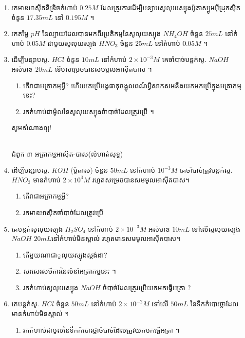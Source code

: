 \documentclass[12pt, a5paper]{article}
\begin{document}
\begin{enumerate}[m]
	\item រកមាឌអាស៊ីតនីឌ្រិចកំហាប់ $0.25M$ ដែលត្រូវការដើម្បីបន្សាបសូលុយស្យុងប៉ូតាស្បូមអ៊ីដ្រុកស៊ីតចំនួន $17.35mL$ នៅ $0.195M$ ។
	\item រកតម្លៃ $pH$ នៃល្បាយដែលបានមកពីរប្រតិកម្មនៃសូលុយស្យុង $NH_4OH$ ចំនួន $25mL$ នៅកំហាប់ $0.05M$ ជាមួយសូលុយស្យុង $HNO_3$ ចំនួន $25mL$ នៅកំហាប់ $0.05M$ ។
	\item ដើម្បីបន្សាបសូ. $HCl$ ចំនួន $10mL$ នៅកំហាប់ $2\times10^{-3}M$ គេចាំបាច់បន្តក់សូ. $NaOH$ អស់មាឌ $20mL$ ទើបសម្រេចបានសមមូលអាស៊ីតបាស ។
	\begin{enumerate}[k]
		\item តើវាជាអត្រាកម្មអ្វី? ហើយគេប្រើអង្គធាតុចង្អុលពណ៍អ្វីសាកសមនឹងយកមកប្រើក្នុងអត្រាកម្មនេះ?
		\item រកកំហាប់ជាម៉ូលនៃសូលុយស្យុងចំាបាច់ដែលត្រូវប្រើ ។
	\end{enumerate}
	\begin{center}
		\sffamily\color{black}
		សូមសំណាងល្អ!
	\end{center}\newpage
	\begin{center}
		\sffamily\color{black}
		\\
		ជំពូក ៣ អត្រាកម្មអាស៊ីត-បាស(លំហាត់សុទ្ធ)
	\end{center}
	\item ដើម្បីបន្សាបសូ. $KOH$ (ប៉ូតាស) ចំនួន $50mL$ នៅកំហាប់ $10^{-3}M$ គេចាំបាច់ត្រូវបន្តក់សូ. $HNO_3$ មានកំហាប់ $2\times 10^{3}M$ រហូតសម្រេចបានសមមូលអាស៊ីតបាស។
	\begin{enumerate}[k,2]
		\item តើវាជាអត្រាកម្មអ្វី? 
		\item រកមាឌអាស៊ីតចាំបាច់ដែលត្រូវប្រើ
	\end{enumerate}
	\item គេបន្តក់សូលុយស្យុង $H_2SO_4$ នៅកំហាប់ $2\times10^{-3}M$ អស់មាឌ $10mL$ ទៅលើសូលុយស្យុង $NaOH$ $20mL$នៅកំហាប់មិនស្គាល់ រហូតមានសមមូលអាស៊ីតបាស។
	\begin{enumerate}[k]
		\item តើមួយណាជាូលុយស្យុងស្តង់ដា?
		\item សរសេរសមីការនៃលំនាំអត្រាកម្មនេះ ។
		\item រកកំហាប់សូលុយស្យុង $NaOH$ ចំបាច់ដែលត្រូវប្រើយកមកធ្វើអត្រា ?
	\end{enumerate}
	\item គេបន្តក់សូ. $HCl$ ចំនួន $50mL$ នៅកំហាប់ $2\times 10^{-2}M$ ទៅលើ $50mL$ នៃទឹកកំបោរថ្លាដែលមានកំហាប់មិនស្គាល់ ។
	\begin{enumerate}[k]
		\item រកកំហាប់ជាមូលនៃទឹកកំបោរថ្លាចំបាច់ដែលត្រូវយកមកធ្វើអត្រា ។

\end{enumerate}
\end{enumerate}
\end{document}
